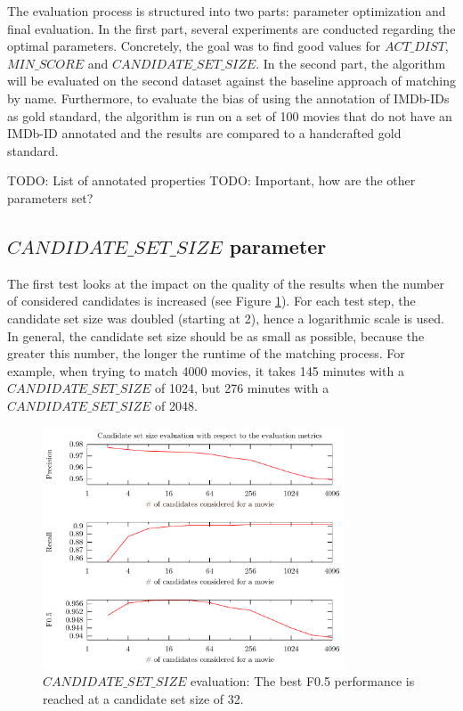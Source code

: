 The evaluation process is structured into two parts: parameter optimization and final evaluation.
In the first part, several experiments are conducted regarding the optimal parameters.
Concretely, the goal was to find good values for $ACT\_DIST$, $MIN\_SCORE$ and $CANDIDATE\_SET\_SIZE$.
In the second part, the algorithm will be evaluated on the second dataset against the baseline approach of matching by name.
Furthermore, to evaluate the bias of using the annotation of IMDb-IDs as gold standard, the algorithm is run on a set of 100 movies that do not have an IMDb-ID annotated and the results are compared to a handcrafted gold standard.

TODO: List of annotated properties
TODO: Important, how are the other parameters set?

\subsection{$CANDIDATE\_SET\_SIZE$ parameter}
The first test looks at the impact on the quality of the results when the number of considered candidates is increased (see Figure \ref{fig_candidate_set_size}).
For each test step, the candidate set size was doubled (starting at 2), hence a logarithmic scale is used.
In general, the candidate set size should be as small as possible, because the greater this number, the longer the runtime of the matching process.
For example, when trying to match 4000 movies, it takes 145 minutes with a $CANDIDATE\_SET\_SIZE$ of 1024, but 276 minutes with a $CANDIDATE\_SET\_SIZE$ of 2048.

\begin{figure}[h!]
  \begin{center}
  \includegraphics[width=0.8\textwidth]{images/candidateSetSize.pdf}
  \end{center}
  \caption{$CANDIDATE\_SET\_SIZE$ evaluation: The best F0.5 performance is reached at a candidate set size of 32.}
  \label{fig_candidate_set_size}
\end{figure}

